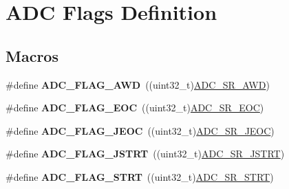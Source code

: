 \hypertarget{group___a_d_c__flags__definition}{}\section{A\+DC Flags Definition}
\label{group___a_d_c__flags__definition}
\subsection*{Macros}
\begin{DoxyCompactItemize}
\item 
\#define {\bfseries A\+D\+C\+\_\+\+F\+L\+A\+G\+\_\+\+A\+WD}~((uint32\+\_\+t)\hyperlink{group___peripheral___registers___bits___definition_ga8b7f27694281e4cad956da567e5583b2}{A\+D\+C\+\_\+\+S\+R\+\_\+\+A\+WD})\hypertarget{group___a_d_c__flags__definition_gadb75a4b430fb84950232b7a8f3a6a877}{}\label{group___a_d_c__flags__definition_gadb75a4b430fb84950232b7a8f3a6a877}

\item 
\#define {\bfseries A\+D\+C\+\_\+\+F\+L\+A\+G\+\_\+\+E\+OC}~((uint32\+\_\+t)\hyperlink{group___peripheral___registers___bits___definition_ga3dc295c5253743aeb2cda582953b7b53}{A\+D\+C\+\_\+\+S\+R\+\_\+\+E\+OC})\hypertarget{group___a_d_c__flags__definition_gaf2c6fdf7e9ab63b778149e5fb56413d4}{}\label{group___a_d_c__flags__definition_gaf2c6fdf7e9ab63b778149e5fb56413d4}

\item 
\#define {\bfseries A\+D\+C\+\_\+\+F\+L\+A\+G\+\_\+\+J\+E\+OC}~((uint32\+\_\+t)\hyperlink{group___peripheral___registers___bits___definition_gabc9f07589bb1a4e398781df372389b56}{A\+D\+C\+\_\+\+S\+R\+\_\+\+J\+E\+OC})\hypertarget{group___a_d_c__flags__definition_ga4df8eea8ab83d98104ee15a339743a4e}{}\label{group___a_d_c__flags__definition_ga4df8eea8ab83d98104ee15a339743a4e}

\item 
\#define {\bfseries A\+D\+C\+\_\+\+F\+L\+A\+G\+\_\+\+J\+S\+T\+RT}~((uint32\+\_\+t)\hyperlink{group___peripheral___registers___bits___definition_ga7340a01ffec051c06e80a037eee58a14}{A\+D\+C\+\_\+\+S\+R\+\_\+\+J\+S\+T\+RT})\hypertarget{group___a_d_c__flags__definition_ga278f4e866f4322c1120bf0db5301c432}{}\label{group___a_d_c__flags__definition_ga278f4e866f4322c1120bf0db5301c432}

\item 
\#define {\bfseries A\+D\+C\+\_\+\+F\+L\+A\+G\+\_\+\+S\+T\+RT}~((uint32\+\_\+t)\hyperlink{group___peripheral___registers___bits___definition_ga45eb11ad986d8220cde9fa47a91ed222}{A\+D\+C\+\_\+\+S\+R\+\_\+\+S\+T\+RT})\hypertarget{group___a_d_c__flags__definition_gad0c59ae7749c69b5b91f2c533db1b619}{}\label{group___a_d_c__flags__definition_gad0c59ae7749c69b5b91f2c533db1b619}


\end{DoxyCompactItemize}
